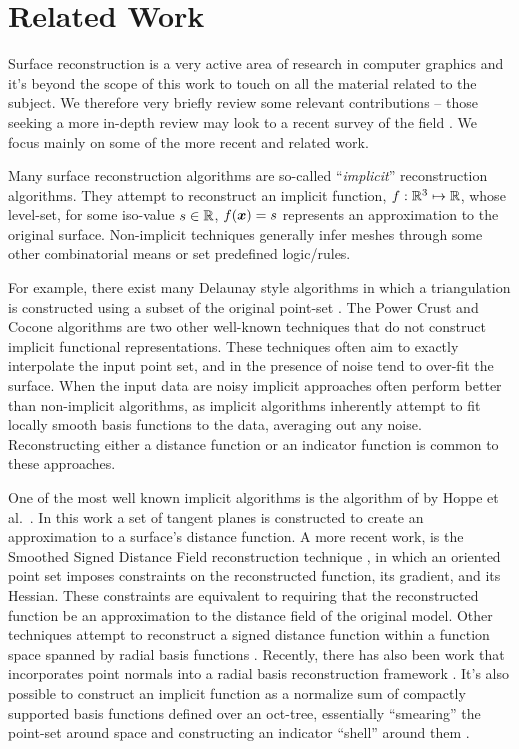 \section{Related Work}
Surface reconstruction is a very active area of research in computer graphics and it's beyond the scope of this work to touch on all the material related to the subject. We therefore very briefly review some relevant contributions -- those seeking a more in-depth review may look to a recent survey of the field \cite{reconstar_eg14}.
We focus mainly on some of the more recent and related work. 

Many surface reconstruction algorithms are so-called ``\emph{implicit}'' reconstruction algorithms. 
They attempt to reconstruct an implicit function, $f : \mathbb{R}^3 \mapsto \mathbb{R} $, whose level-set, for some iso-value $s \in \mathbb{R}$, $f(\boldsymbol{x})=s$ represents an approximation to the original surface. 
Non-implicit techniques generally infer meshes through some other combinatorial means or set predefined logic/rules.

For example, there exist many Delaunay style algorithms in which a triangulation is constructed using a subset of the original point-set \cite{delaunay}. 
The Power Crust \cite{powercrust} and Cocone \cite{cocone} algorithms are two other well-known techniques that do not construct implicit functional representations. 
These techniques often aim to exactly interpolate the input point set, and in the presence of noise tend to over-fit the surface. 
When the input data are noisy implicit approaches often perform better than non-implicit algorithms, as implicit algorithms inherently attempt to fit locally smooth basis functions to the data, averaging out any noise. 
Reconstructing either a distance function or an indicator function is common to these approaches.

One of the most well known implicit algorithms is the algorithm of by Hoppe et al.~\cite{hoppecut}. In this work a set of
tangent planes is constructed to create an approximation to a surface's distance function. 
A more recent work, is the Smoothed Signed Distance Field reconstruction technique \cite{ssdrecon}, in which an oriented point set imposes constraints on the reconstructed function, its gradient, and its Hessian. 
These constraints are equivalent to requiring that the reconstructed function be an approximation to the distance field of the original model. 
Other techniques attempt to reconstruct a signed distance function within a function space spanned by radial basis functions \cite{radial}. 
Recently, there has also been work that incorporates point normals into a radial basis reconstruction framework \cite{hermite}. 
It's also possible to construct an implicit function as a normalize sum of compactly supported basis functions defined over an oct-tree, essentially ``smearing'' the point-set around space and constructing an indicator ``shell'' around them \cite{Fuhrmann2014}.

